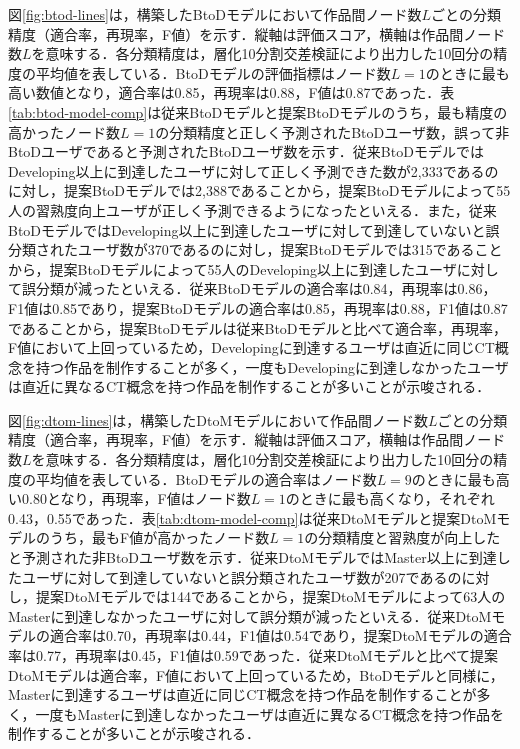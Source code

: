 \documentclass[submit,ses,noauthor]{ipsj}
\begin{document}
図\ref{fig:btod-lines}は，構築したBtoDモデルにおいて作品間ノード数$L$ごとの分類精度（適合率，再現率，F値）を示す．縦軸は評価スコア，横軸は作品間ノード数$L$を意味する．各分類精度は，層化10分割交差検証により出力した10回分の精度の平均値を表している．BtoDモデルの評価指標はノード数$L=1$のときに最も高い数値となり，適合率は0.85，再現率は0.88，F値は0.87であった．表\ref{tab:btod-model-comp}は従来BtoDモデルと提案BtoDモデルのうち，最も精度の高かったノード数$L=1$の分類精度と正しく予測されたBtoDユーザ数，誤って非BtoDユーザであると予測されたBtoDユーザ数を示す．従来BtoDモデルではDeveloping以上に到達したユーザに対して正しく予測できた数が2,333であるのに対し，提案BtoDモデルでは2,388であることから，提案BtoDモデルによって55人の習熟度向上ユーザが正しく予測できるようになったといえる．また，従来BtoDモデルではDeveloping以上に到達したユーザに対して到達していないと誤分類されたユーザ数が370であるのに対し，提案BtoDモデルでは315であることから，提案BtoDモデルによって55人のDeveloping以上に到達したユーザに対して誤分類が減ったといえる．従来BtoDモデルの適合率は0.84，再現率は0.86，F1値は0.85であり，提案BtoDモデルの適合率は0.85，再現率は0.88，F1値は0.87であることから，提案BtoDモデルは従来BtoDモデルと比べて適合率，再現率，F値において上回っているため，Developingに到達するユーザは直近に同じCT概念を持つ作品を制作することが多く，一度もDevelopingに到達しなかったユーザは直近に異なるCT概念を持つ作品を制作することが多いことが示唆される．

図\ref{fig:dtom-lines}は，構築したDtoMモデルにおいて作品間ノード数$L$ごとの分類精度（適合率，再現率，F値）を示す．縦軸は評価スコア，横軸は作品間ノード数$L$を意味する．各分類精度は，層化10分割交差検証により出力した10回分の精度の平均値を表している．BtoDモデルの適合率はノード数$L=9$のときに最も高い0.80となり，再現率，F値はノード数$L=1$のときに最も高くなり，それぞれ0.43，0.55であった．表\ref{tab:dtom-model-comp}は従来DtoMモデルと提案DtoMモデルのうち，最もF値が高かったノード数$L=1$の分類精度と習熟度が向上したと予測された非BtoDユーザ数を示す．従来DtoMモデルではMaster以上に到達したユーザに対して到達していないと誤分類されたユーザ数が207であるのに対し，提案DtoMモデルでは144であることから，提案DtoMモデルによって63人のMasterに到達しなかったユーザに対して誤分類が減ったといえる．従来DtoMモデルの適合率は0.70，再現率は0.44，F1値は0.54であり，提案DtoMモデルの適合率は0.77，再現率は0.45，F1値は0.59であった．従来DtoMモデルと比べて提案DtoMモデルは適合率，F値において上回っているため，BtoDモデルと同様に，Masterに到達するユーザは直近に同じCT概念を持つ作品を制作することが多く，一度もMasterに到達しなかったユーザは直近に異なるCT概念を持つ作品を制作することが多いことが示唆される．
\end{document}

